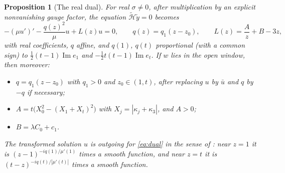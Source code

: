 \documentclass[11pt]{amsart}
\newtheorem{proposition}[theorem]{Proposition}
\theoremstyle{definition}
\theoremstyle{remark}
\numberwithin{equation}{section}
\renewcommand{\Im}{\operatorname{Im}}
\begin{document}
\begin{proposition}[The real dual]\label{prop:dual}
For real $\sigma\ne0$, after multiplication by an explicit nonvanishing gauge factor, the equation
$\widetilde{\mathcal H}\tilde y=0$ becomes
\begin{equation}\label{eq:dual}
-(\mu u')'-\frac{q(z)^2}{\mu}u+L(z)u=0,\qquad q(z)=q_1(z-z_0),\qquad L(z)=\frac{A}{z}+B-3z,
\end{equation}
with real coefficients, $q$ affine, and $q(1)$, $q(t)$ proportional (with a common sign) to
$\frac12(t-1)\Im e_1$ and $-\frac12t(t-1)\Im e_t$. If $w$ lies in the open window, then moreover:
\begin{itemize}
\item $q=q_1(z-z_0)$ with $q_1>0$ and $z_0\in(1,t)$, after replacing $u$ by $\bar u$ and $q$ by $-q$ if necessary;
\item $A=t\big(X_0^2-(X_1+X_t)^2\big)$ with $X_j=|\kappa_j+\kappa_3|$, and $A>0$;
\item $B=\lambda C_0+c_1$.
\end{itemize}
The transformed solution $u$ is outgoing for \eqref{eq:dual} in the sense of \cite[(3.4)]{Hin26}: near $z=1$ it is
$(z-1)^{-iq(1)/\mu'(1)}$ times a smooth function, and near $z=t$ it is $(t-z)^{-iq(t)/|\mu'(t)|}$ times a smooth
function.
\end{proposition}
\end{document}
